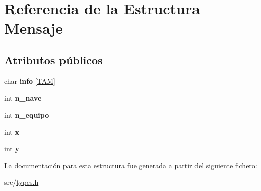 \hypertarget{structMensaje}{}\section{Referencia de la Estructura Mensaje}
\label{structMensaje}
\subsection*{Atributos públicos}
\begin{DoxyCompactItemize}
\item 
\mbox{\label{structMensaje_a4e71da8fc67abc10c724df97194b7634}} 
char {\bfseries info} \mbox{[}\hyperlink{types_8h_ae0b4816fb45161ef9da5e6d6134ee28a}{T\+AM}\mbox{]}
\item 
\mbox{\label{structMensaje_aca66756f8b0eabb4d54e5ad57658c6d4}} 
int {\bfseries n\+\_\+nave}
\item 
\mbox{\label{structMensaje_ae67ecce3997185e65960fb5b32334258}} 
int {\bfseries n\+\_\+equipo}
\item 
\mbox{\label{structMensaje_ac3b6a217eefdd69948b675c9410045c2}} 
int {\bfseries x}
\item 
\mbox{\label{structMensaje_a4503e89a9f6a07a0a99fb4bed4cc8e6f}} 
int {\bfseries y}
\end{DoxyCompactItemize}


La documentación para esta estructura fue generada a partir del siguiente fichero\+:\begin{DoxyCompactItemize}
\item 
src/\hyperlink{types_8h}{types.\+h}\end{DoxyCompactItemize}

